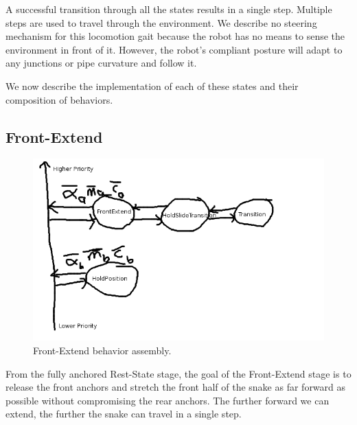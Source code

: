 A successful transition through all the states results in a single step.  Multiple steps are used to travel through the environment.  We describe no steering mechanism for this locomotion gait because the robot has no means to sense the environment in front of it.  However, the robot’s compliant posture will adapt to any junctions or pipe curvature and follow it.

We now describe the implementation of each of these states and their composition of behaviors.



\subsection{Front-Extend}

\begin{figure}
\begin{center}
\includegraphics[scale=0.5]{2_adaptive_1.png}
\end{center}
\caption{Front-Extend behavior assembly.}
\label{adaptive1}
\end{figure}


From the fully anchored Rest-State stage, the goal of the Front-Extend stage is to release the front anchors and stretch the front half of the snake as far forward as possible without compromising the rear anchors.  The further forward we can extend, the further the snake can travel in a single step.

